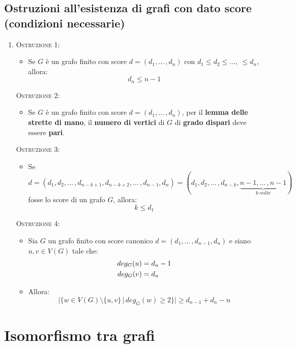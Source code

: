 \documentclass[10pt]{article}
\begin{document}
	\subsection{Ostruzioni all'esistenza di grafi con dato score (condizioni necessarie)}
	\begin{enumerate}
	\item
	\textsc{Ostruzione 1:} 
	\begin{itemize}
	\item
	Se $G$ è un grafo finito con score $d = (d_1, \dotso\,,d_n)$ con $d_1 \leq d_2 \leq \dotso,\ \leq d_n$, allora: $$d_n \leq n - 1$$
	\end{itemize}
	\textsc{Ostruzione 2:} 
	\begin{itemize}
	\item
	Se $G$ è un grafo finito con score $d = (d_1, \dotso\,,d_n)$, per il \textbf{lemma delle strette di mano}, il \textbf{numero di vertici} di $G$ di \textbf{grado dispari} deve essere \textbf{pari}.
	\end{itemize}
	\textsc{Ostruzione 3:} 
	\begin{itemize}
	\item
	Se $d = (d_1, d_2, \dotso\,, d_{n-k+1}, d_{n-k+2}, \dotso\,,d_{n-1}, d_n) = (d_1, d_2, \dotso\,, d_{n-k}, \underbrace{n-1, \dotso\,, n-1}_{k\textrm{-volte}})$ fosse lo score di un grafo $G$, allora:
	$$k \leq d_1 $$
	\end{itemize}
	\textsc{Ostruzione 4:} 
	\begin{itemize}
	\item
	Sia $G$ un grafo finito con score canonico $d=(d_1, \dotso\,,d_{n-1},d_n)$ e siano $u,v \in V(G)$ tale che:
	\begin{equation}
	\begin{split}
	deg_G(u) &= d_n - 1 \\
	deg_G(v) &= d_n
	\notag
	\end{split}
	\end{equation}
	\item
	Allora:
	$$|\{w \in V(G)\setminus \{u,v\}\,|\,deg_G(w)\geq 2\}| \geq d_{n-1} + d_n - n$$
	\end{itemize}
	\end{enumerate}
	
	\section{Isomorfismo tra grafi}
\end{document}
